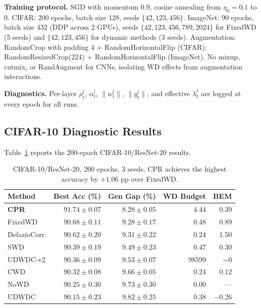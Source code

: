 \documentclass{article}
\begin{document}
\textbf{Training protocol.} SGD with momentum 0.9, cosine annealing from $\eta_0 = 0.1$ to 0. CIFAR: 200 epochs, batch size 128, seeds $\{42, 123, 456\}$. ImageNet: 90 epochs, batch size 432 (DDP across 2 GPUs), seeds $\{42, 123, 456, 789, 2024\}$ for FixedWD (5 seeds) and $\{42, 123, 456\}$ for dynamic methods (3 seeds). Augmentation: RandomCrop with padding 4 + RandomHorizontalFlip (CIFAR); RandomResizedCrop(224) + RandomHorizontalFlip (ImageNet). No mixup, cutmix, or RandAugment for CNNs, isolating WD effects from augmentation interactions.

\textbf{Diagnostics.} Per-layer $\rho_t^l$, $\alpha_t^l$, $\|w_t^l\|$, $\|g_t^l\|$, and effective $\lambda_t^l$ are logged at every epoch for all runs.

\subsection{CIFAR-10 Diagnostic Results}

Table~\ref{tab:cifar10} reports the 200-epoch CIFAR-10/ResNet-20 results.

\begin{table}[t]
\caption{CIFAR-10/ResNet-20, 200 epochs, 3 seeds. CPR achieves the highest accuracy by $+1.06$ pp over FixedWD.}
\label{tab:cifar10}
\centering
\begin{tabular}{lrrrr}
\toprule
Method & Best Acc (\%) & Gen Gap (\%) & WD Budget & BEM \\
\midrule
\textbf{CPR} & $\mathbf{91.74 \pm 0.07}$ & $\mathbf{8.28 \pm 0.05}$ & 4.44 & 0.39 \\
FixedWD & $90.68 \pm 0.11$ & $9.28 \pm 0.17$ & 0.48 & 0.89 \\
DefazioCorr. & $90.62 \pm 0.20$ & $9.31 \pm 0.22$ & 0.24 & 1.50 \\
SWD & $90.39 \pm 0.19$ & $9.49 \pm 0.23$ & 0.47 & 0.30 \\
UDWDC-v2 & $90.36 \pm 0.09$ & $9.53 \pm 0.07$ & 98599 & ${\sim}0$ \\
CWD & $90.32 \pm 0.08$ & $9.66 \pm 0.05$ & 0.24 & 0.12 \\
NoWD & $90.25 \pm 0.30$ & $9.73 \pm 0.30$ & 0.00 & --- \\
UDWDC & $90.15 \pm 0.23$ & $9.82 \pm 0.25$ & 0.38 & $-$0.26 \\
\bottomrule
\end{tabular}
\end{table}
\end{document}
